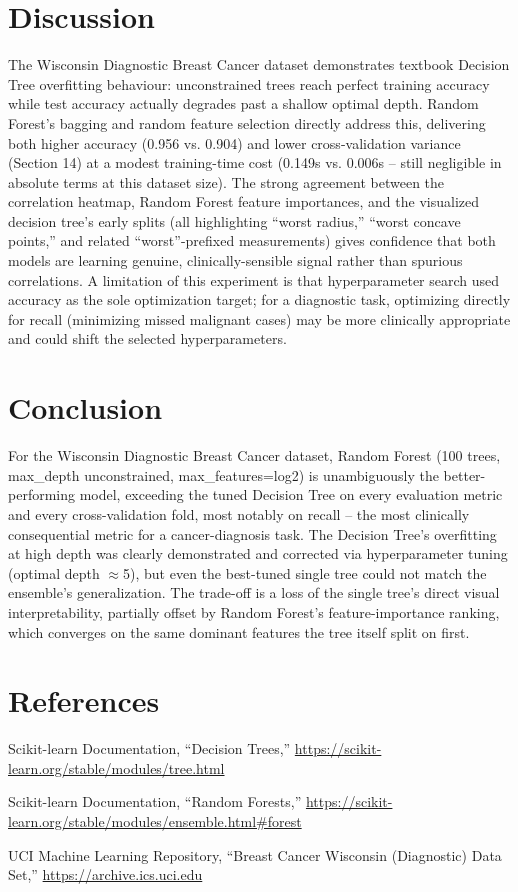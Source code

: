 \documentclass[12pt,a4paper]{article}
\begin{document}
\section{Discussion}
The Wisconsin Diagnostic Breast Cancer dataset demonstrates textbook Decision Tree
overfitting behaviour: unconstrained trees reach perfect training accuracy while test
accuracy actually degrades past a shallow optimal depth. Random Forest's bagging and random
feature selection directly address this, delivering both higher accuracy (0.956 vs. 0.904)
and lower cross-validation variance (Section 14) at a modest training-time cost (0.149s vs.
0.006s -- still negligible in absolute terms at this dataset size). The strong agreement
between the correlation heatmap, Random Forest feature importances, and the visualized
decision tree's early splits (all highlighting ``worst radius,'' ``worst concave points,'' and
related ``worst''-prefixed measurements) gives confidence that both models are learning
genuine, clinically-sensible signal rather than spurious correlations. A limitation of this
experiment is that hyperparameter search used accuracy as the sole optimization target; for a
diagnostic task, optimizing directly for recall (minimizing missed malignant cases) may be
more clinically appropriate and could shift the selected hyperparameters.

\section{Conclusion}
For the Wisconsin Diagnostic Breast Cancer dataset, Random Forest (100 trees, max\_depth
unconstrained, max\_features=log2) is unambiguously the better-performing model, exceeding
the tuned Decision Tree on every evaluation metric and every cross-validation fold, most
notably on recall -- the most clinically consequential metric for a cancer-diagnosis task.
The Decision Tree's overfitting at high depth was clearly demonstrated and corrected via
hyperparameter tuning (optimal depth $\approx$5), but even the best-tuned single tree could
not match the ensemble's generalization. The trade-off is a loss of the single tree's direct
visual interpretability, partially offset by Random Forest's feature-importance ranking,
which converges on the same dominant features the tree itself split on first.

\section{References}
\begin{enumerate}[label={[\arabic*]}]
\item Scikit-learn Documentation, ``Decision Trees,'' \url{https://scikit-learn.org/stable/modules/tree.html}
\item Scikit-learn Documentation, ``Random Forests,'' \url{https://scikit-learn.org/stable/modules/ensemble.html#forest}
\item UCI Machine Learning Repository, ``Breast Cancer Wisconsin (Diagnostic) Data Set,'' \url{https://archive.ics.uci.edu}
\end{enumerate}
\end{document}

